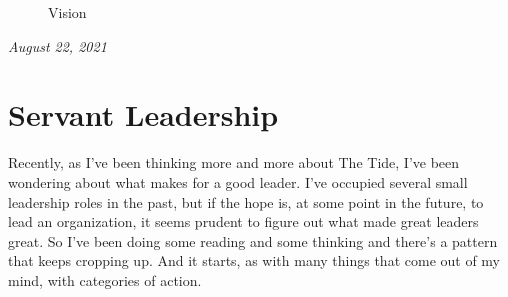 \documentclass[10pt,a5paper]{book}
\begin{document}
\begin{figure}[!htb]
\caption{\label{fig:my-label} Vision}
\end{figure}


\textit{August 22, 2021}

\newpage

\section{Servant Leadership}
Recently, as I've been thinking more and more about The Tide, I've been wondering about what makes for a good leader. I've occupied several small leadership roles in the past, but if the hope is, at some point in the future, to lead an organization, it seems prudent to figure out what made great leaders great. So I've been doing some reading and some thinking and there's a pattern that keeps cropping up. And it starts, as with many things that come out of my mind, with categories of action.
\end{document}
